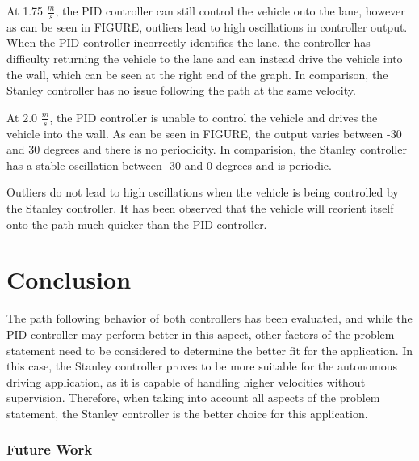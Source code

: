 \documentclass[arbeit=studie,oneside,BCOR=12mm]{ArbeitRST}
\begin{document}
At 1.75 $\frac{m}{s}$, the PID controller can still control the vehicle onto
the lane, however as can be seen in FIGURE, outliers lead to high oscillations
in controller output. When the PID controller incorrectly identifies the lane,
the controller has difficulty returning the vehicle to the lane and can instead
drive the vehicle into the wall, which can be seen at the right end of the
graph. In comparison, the Stanley controller has no issue following the path at
the same velocity. 

At 2.0 $\frac{m}{s}$, the PID controller is unable to control the vehicle and
drives the vehicle into the wall. As can be seen in FIGURE, the output varies
between -30 and 30 degrees and there is no periodicity. In comparision, the
Stanley controller has a stable oscillation between -30 and 0 degrees and is
periodic.

Outliers do not lead to high oscillations when the vehicle is being controlled
by the Stanley controller. It has been observed that the vehicle will reorient
itself onto the path much quicker than the PID controller.



\chapter{Conclusion}

\iffalse
When comparing only the path following behaviour of both controllers, the PID
controller is still the best choice. However, when factoring in the other
aspects of the problem statement, the Stanley controller is a better fit for
the application. As the vehicle needs to be able to drive autonomously without
supervision at a higher velocity than it can originally, the Stanley controller
fulfills these requirements. 
\fi

The path following behavior of both controllers has been evaluated, and while
the PID controller may perform better in this aspect, other factors of the
problem statement need to be considered to determine the better fit for the
application. In this case, the Stanley controller proves to be more suitable
for the autonomous driving application, as it is capable of handling higher
velocities without supervision. Therefore, when taking into account all aspects
of the problem statement, the Stanley controller is the better choice for this
application.

\subsection{Future Work}
\end{document}
